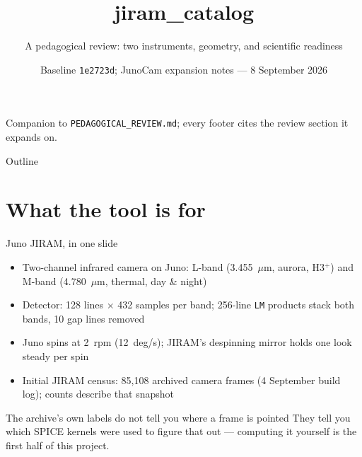 \documentclass[aspectratio=169,11pt]{beamer}
\title{\textbf{jiram\_catalog}}
\subtitle{A pedagogical review: two instruments, geometry, and scientific readiness}
\author{}
\date{\small Baseline \texttt{1e2723d}; JunoCam expansion notes --- 8 September 2026}
\newcommand{\currevsec}{}
\newcommand{\revsec}[1]{\gdef\currevsec{#1}}
\begin{document}
\begin{frame}[plain]
  \titlepage
  {\small\color{jirgray} Companion to \texttt{PEDAGOGICAL\_REVIEW.md}; every footer cites the review section it expands on.}
\end{frame}

\begin{frame}{Outline}
  \revsec{}
  \tableofcontents
\end{frame}

\section{What the tool is for}

\begin{frame}{Juno JIRAM, in one slide}
  \revsec{1}
  \begin{itemize}
    \item Two-channel infrared camera on Juno: L-band (3.455~$\mu$m, aurora, H3$^+$) and M-band (4.780~$\mu$m, thermal, day \& night)
    \item Detector: 128 lines $\times$ 432 samples per band; 256-line \texttt{LM} products stack both bands, 10 gap lines removed
    \item Juno spins at 2~rpm (12~deg/s); JIRAM's despinning mirror holds one look steady per spin
    \item Initial JIRAM census: 85{,}108 archived camera frames (4 September build log); counts describe that snapshot
  \end{itemize}
  \vspace{0.3cm}
  \begin{block}{The archive's own labels do not tell you where a frame is pointed}
    They tell you which SPICE kernels were used to figure that out --- computing it yourself is the first half of this project.
  \end{block}
\end{frame}
\end{document}
